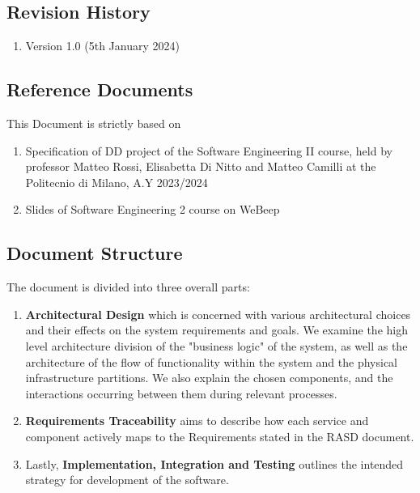 \subsection{Revision History}
\begin{enumerate}
    \item Version 1.0 (5th January 2024)
\end{enumerate}



\subsection{Reference Documents}
This Document is strictly based on 
\begin{enumerate}
    \item Specification of DD project of the Software Engineering II course, held by professor Matteo Rossi, Elisabetta Di Nitto and Matteo Camilli at the Politecnio di Milano, A.Y 2023/2024
    \item Slides of Software Engineering 2 course on WeBeep
\end{enumerate}

\subsection{Document Structure}
The document is divided into three overall parts:
\begin{enumerate}
    \item \textbf{Architectural Design} which is concerned with various architectural choices and their effects on the system requirements and goals. We examine the high level architecture division of the "business logic" of the system, as well as the architecture of the flow of functionality within the system and the physical infrastructure partitions. We also explain the chosen components, and the interactions occurring between them during relevant processes.  
    \item \textbf{Requirements Traceability} aims to describe how each service and component actively maps to the Requirements stated in the RASD document. 
    \item Lastly, \textbf{Implementation, Integration and Testing} outlines the intended strategy for development of the software. 
\end{enumerate}

\newpage